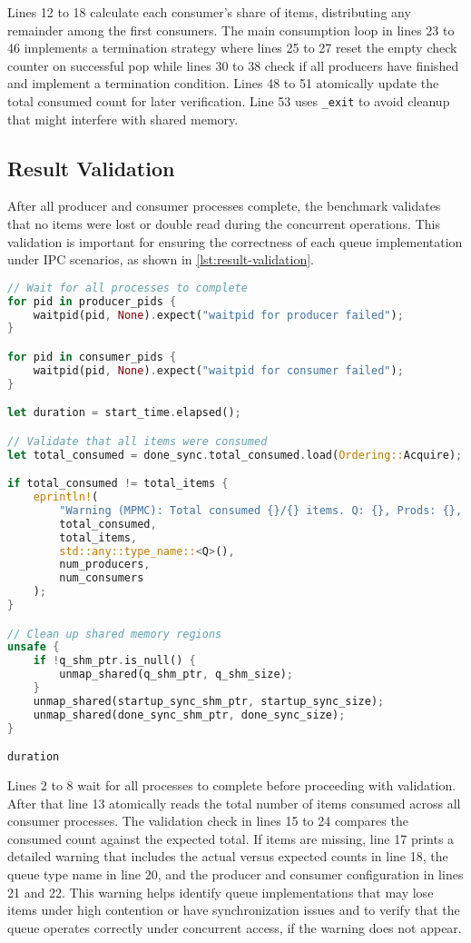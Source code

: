 Lines 12 to 18 calculate each consumer's share of items, distributing any remainder among the first consumers. The main consumption loop in lines 23 to 46 implements a termination strategy where lines 25 to 27 reset the empty check counter on successful pop while lines 30 to 38 check if all producers have finished and implement a termination condition. Lines 48 to 51 atomically update the total consumed count for later verification. Line 53 uses \texttt{\_exit} to avoid cleanup that might interfere with shared memory.

\subsection{Result Validation}
After all producer and consumer processes complete, the benchmark validates that no items were lost or double read during the concurrent operations. This validation is important for ensuring the correctness of each queue implementation under \ac{IPC} scenarios, as shown in \cref{lst:result-validation}.

\begin{lstlisting}[language=Rust, style=boxed, caption={Post-benchmark validation of results}, label={lst:result-validation}]
// Wait for all processes to complete
for pid in producer_pids {
    waitpid(pid, None).expect("waitpid for producer failed");
}

for pid in consumer_pids {
    waitpid(pid, None).expect("waitpid for consumer failed");
}

let duration = start_time.elapsed();

// Validate that all items were consumed
let total_consumed = done_sync.total_consumed.load(Ordering::Acquire);

if total_consumed != total_items {
    eprintln!(
        "Warning (MPMC): Total consumed {}/{} items. Q: {}, Prods: {}, Cons: {}",
        total_consumed,
        total_items,
        std::any::type_name::<Q>(),
        num_producers,
        num_consumers
    );
}

// Clean up shared memory regions
unsafe {
    if !q_shm_ptr.is_null() {
        unmap_shared(q_shm_ptr, q_shm_size);
    }
    unmap_shared(startup_sync_shm_ptr, startup_sync_size);
    unmap_shared(done_sync_shm_ptr, done_sync_size);
}

duration
\end{lstlisting}

Lines 2 to 8 wait for all processes to complete before proceeding with validation. After that line 13 atomically reads the total number of items consumed across all consumer processes. The validation check in lines 15 to 24 compares the consumed count against the expected total. If items are missing, line 17 prints a detailed warning that includes the actual versus expected counts in line 18, the queue type name in line 20, and the producer and consumer configuration in lines 21 and 22. This warning helps identify queue implementations that may lose items under high contention or have synchronization issues and to verify that the queue operates correctly under concurrent access, if the warning does not appear.

